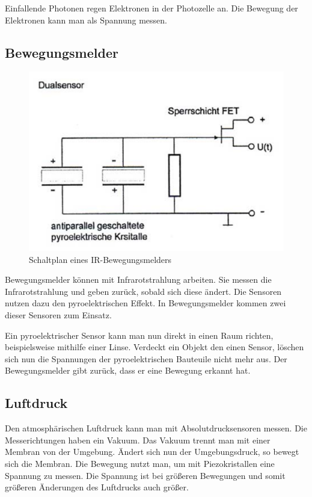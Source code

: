 Einfallende Photonen regen Elektronen in der Photozelle an. Die Bewegung der Elektronen kann man als Spannung messen.

\cite{mc}

\subsection{Bewegungsmelder}
\begin{figure}
\includegraphics[scale=0.4]{bilder/bewegungsmelder} 
\caption[Schaltplan eines IR-Bewegungsmelders]{Schaltplan eines IR-Bewegungsmelders \cite{UniMuenchen}}
\label{Bewegungsmelder}
\end{figure}
Bewegungsmelder können mit Infrarotstrahlung arbeiten. Sie messen die Infrarotstrahlung und geben zurück, sobald sich diese ändert. 
Die Sensoren nutzen dazu den pyroelektrischen Effekt. In Bewegungsmelder kommen zwei dieser Sensoren zum Einsatz.   



Ein pyroelektrischer Sensor kann man nun direkt in einen Raum richten, beispielsweise mithilfe einer Linse. Verdeckt ein Objekt den einen Sensor, löschen sich nun die Spannungen der pyroelektrischen Bauteuile nicht mehr aus. Der Bewegungsmelder gibt zurück, dass er eine Bewegung erkannt hat. 

\cite{UniMuenchen}

\subsection{Luftdruck}
Den atmosphärischen Luftdruck kann man mit Absolutdrucksensoren messen. Die Messerichtungen haben ein Vakuum. Das Vakuum trennt man mit einer Membran von der Umgebung. Ändert sich nun der Umgebungsdruck, so bewegt sich die Membran. Die Bewegung nutzt man, um mit Piezokristallen eine Spannung zu messen. Die Spannung ist bei größeren Bewegungen und somit größeren Änderungen des Luftdrucks auch größer.

